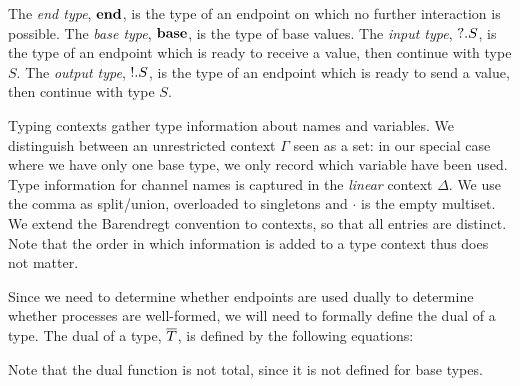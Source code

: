 The \emph{end type}, \( \mathbf{end} \), is the type of an endpoint on which no further interaction is possible.
The \emph{base type}, \( \mathbf{base} \), is the type of base values.
The \emph{input type}, \( {?}.S \), is the type of an endpoint which is ready to receive a value, then continue with type \( S \).
The \emph{output type}, \( {!}.S \), is the type of an endpoint which is ready to send a value, then continue with type \( S \).

Typing contexts gather type information about names and variables. We distinguish between an unrestricted context $\Gamma$ seen as a set: in our special case where we have only one base type, we only record which variable have been used.
%
Type information for channel names is captured in the \emph{linear}
context $\Delta$. We use the comma as split/union, overloaded to
singletons and $\cdot$ is the empty multiset.
We extend the Barendregt convention to contexts, so that all entries
are distinct.  Note that the order in which information is added to a
type context thus does not matter.

Since we need to determine whether endpoints are used dually to determine whether processes are well-formed, we will need to formally define the dual of a type.
The dual of a type, \( \overline{T} \), is defined by the following equations:
Note that the dual function is not total, since it is not defined for base types.

